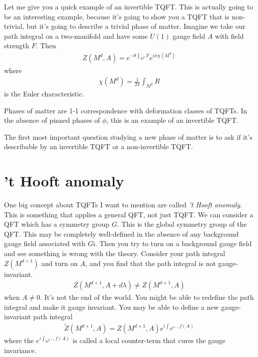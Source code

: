 Let me give you a quick example of an invertible TQFT.
This is actually going to be an interesting example,
because it's going to show you a TQFT that is non-trivial,
but it's going to describe a trivial phase of matter.
Imagine we take our path integral on a two-manifold
and have some $U(1)$ gauge field $A$ with field strength $F$.
Then
\begin{align}
    Z\left( M^d, A \right)
    =
    e^{-\theta \int_{M^2} F}
    e^{i\phi \chi\left( M^d \right)}
\end{align}
where
\begin{align}
    \chi\left( M^d \right) = \frac{1}{2\pi}\int_{M^2}R
\end{align}
is the Euler characteristic.

Phases of matter are 1-1 correspondence with deformation classes of TQFTs.
In the absence of pinned phases of $\phi$,
this is an example of an invertible TQFT.

The first most important question studying a new phase of matter is to ask if
it's describable by an invertible TQFT or a non-invertible TQFT.

\section{'t Hooft anomaly}
One big concept about TQFTs I want to mention are called
\emph{'t Hooft anomaly}.
This is something that applies a general QFT,
not just TQFT.
We can consider a QFT which has a symmetry group $G$.
This is the global symmetry group of the QFT.
This may be completely well-defined in the absence of any background gauge field
associated with $G$i.
Then you try to turn on a background gauge field and see something is wrong
with the theory.
Consider your path integral $Z(M^{d+1})$ and turn on $A$,
and you find that the path integral is not gauge-invariant.
\begin{align}
    Z\left( M^{d+1}, A + d\lambda \right)
    \ne
    Z\left( M^{d+1}, A \right)
\end{align}
when $A\ne 0$.
It's not the end of the world.
You might be able to redefine the path integral and make it gauge invariant.
You may be able to define a new gauge-invariant path integral
\begin{align}
    \tilde{Z}\left( M^{d+1}, A \right)
    = Z\left( M^{d+1}, A \right)
    e^{i\int_{M^{d+1}} f(A)}
\end{align}
where the $e^{i\int_{M^{d+1}} f(A)}$
is called a local counter-term that cures the gauge invariance.

